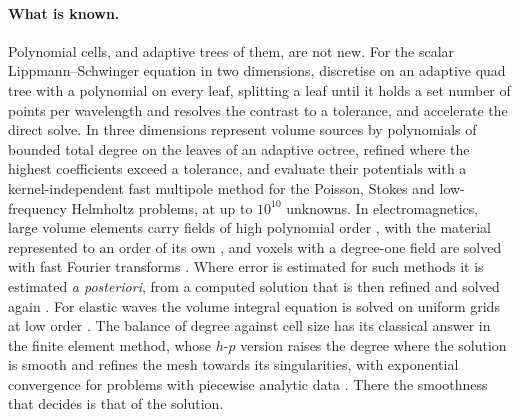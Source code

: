 \documentclass[11pt,a4paper]{article}
\begin{document}
\paragraph{What is known.} Polynomial cells, and adaptive trees of them, are not new. For the scalar
Lippmann--Schwinger equation in two dimensions, \citet{Ambikasaran2015} discretise on an adaptive quad
tree with a polynomial on every leaf, splitting a leaf until it holds a set number of points per
wavelength and resolves the contrast to a tolerance, and \citet{Gopal2020} accelerate the direct solve.
In three dimensions \citet{Malhotra2015,Malhotra2016} represent volume sources by polynomials of bounded
total degree on the leaves of an adaptive octree, refined where the highest coefficients exceed a
tolerance, and evaluate their potentials with a kernel-independent fast multipole method
\citep{Ying2004} for the Poisson, Stokes and low-frequency Helmholtz problems, at up to $10^{10}$
unknowns. In electromagnetics, large volume elements carry fields of high polynomial order
\citep{Chobanyan2013}, with the material represented to an order of its own \citep{Chobanyan2015}, and
voxels with a degree-one field are solved with fast Fourier transforms \citep{Georgakis2020}. Where
error is estimated for such methods it is estimated \emph{a posteriori}, from a computed solution that
is then refined and solved again \citep{Beilina2022}. For elastic waves the volume integral equation is
solved on uniform grids at low order \citep{Shekhar2023}. The balance of degree against cell size has
its classical answer in the finite element method, whose $h$-$p$ version raises the degree where the
solution is smooth and refines the mesh towards its singularities, with exponential convergence for
problems with piecewise analytic data \citep{Guo1986,Babuska1994}. There the smoothness that decides is
that of the solution.
\end{document}

